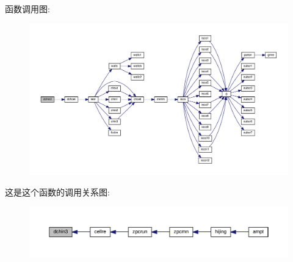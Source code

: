 函数调用图\+:
\nopagebreak
\begin{figure}[H]
\begin{center}
\leavevmode
\includegraphics[width=350pt]{dchin3_8f90_a999bd709743bf8a06ac16aed5f65be0f_cgraph}
\end{center}
\end{figure}
这是这个函数的调用关系图\+:
\nopagebreak
\begin{figure}[H]
\begin{center}
\leavevmode
\includegraphics[width=350pt]{dchin3_8f90_a999bd709743bf8a06ac16aed5f65be0f_icgraph}
\end{center}
\end{figure}

